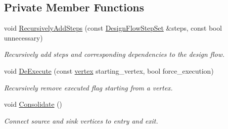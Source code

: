 \subsection*{Private Member Functions}
\begin{DoxyCompactItemize}
\item 
void \hyperlink{classDesignFlowManager_ab5d3fe2338fef7db3edacd11d8539da0}{Recursively\+Add\+Steps} (const \hyperlink{classDesignFlowStepSet}{Design\+Flow\+Step\+Set} \&steps, const bool unnecessary)
\begin{DoxyCompactList}\small\item\em Recursively add steps and corresponding dependencies to the design flow. \end{DoxyCompactList}\item 
void \hyperlink{classDesignFlowManager_ac61f3e68a4afd29ca8c5667eb4fc3e81}{De\+Execute} (const \hyperlink{graph_8hpp_abefdcf0544e601805af44eca032cca14}{vertex} starting\+\_\+vertex, bool force\+\_\+execution)
\begin{DoxyCompactList}\small\item\em Recursively remove executed flag starting from a vertex. \end{DoxyCompactList}\item 
void \hyperlink{classDesignFlowManager_a7c196a82bdb37a21941565f453fa3814}{Consolidate} ()
\begin{DoxyCompactList}\small\item\em Connect source and sink vertices to entry and exit. \end{DoxyCompactList}\end{DoxyCompactItemize}

